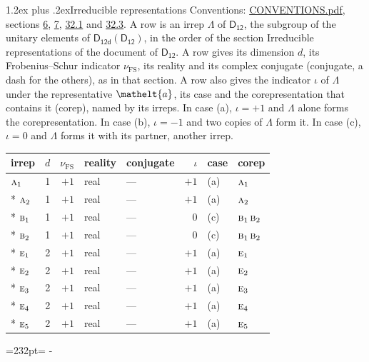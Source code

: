 \documentclass[10pt,a4paper]{article}
\makeatletter
\renewcommand\section{\@startsection{section}{1}{\z@}{-3ex plus -1ex minus -.2ex}%
  {1.2ex plus .2ex}{\normalfont\large\sffamily\bfseries\color{parttitle}}}
\newcommand{\needspace}[1]{\par\penalty-100\begingroup\dimen0=#1\relax\dimen2=\pagegoal
  \advance\dimen2-\pagetotal\ifdim\dimen0>\dimen2\relax\ifdim\dimen2>0pt\vfil\break\fi\fi
  \endgroup}
\numberwithin{equation}{section}
\newcommand{\eltfont}[1]{{\let\sigma\eltsigma\mathelt{#1}}}
\newcommand{\grp}[1]{\mathsf{#1}}
\newcommand{\irr}[1]{\text{\normalfont\scshape #1}}
\newcommand{\elt}[1]{\eltfont{#1}}
\newcommand{\fsind}{\nu_{\mathrm{FS}}}
\makeatother
\begin{document}
\section{Irreducible representations}\label{s:irreps}
Conventions: \href{../../CONVENTIONS.pdf}{CONVENTIONS.pdf}, sections \href{../../../rotation/CONVENTIONS.pdf\#conv.6}{6}, \href{../../../rotation/CONVENTIONS.pdf\#conv.7}{7}, \href{../../CONVENTIONS.pdf\#conv.32.1}{32.1} and \href{../../CONVENTIONS.pdf\#conv.32.3}{32.3}.
\leavevmode\label{n:irrep.Delta}A row is an irrep $\Lambda$ of $\grp{D_{12}}$, the subgroup of the unitary elements of $\grp{D_{12d}}(\grp{D_{12}})$, in the order of the section Irreducible representations of the document of \href{../../../rotation/data/pdf/D12.pdf}{$\grp{D_{12}}$}. \label{n:index.dimension}\label{n:index.frobenius}\label{n:head.irrep}\label{n:head.reality}\label{n:head.conjugate}A row gives its dimension $d$, its Frobenius--Schur indicator $\fsind$, its reality and its complex conjugate (conjugate, a dash for the others), as in that section. \label{n:head.case.corep}\label{n:head.corep}A row also gives the indicator $\iota$ of $\Lambda$ under the representative $\elt{a}$, its case and the corepresentation that contains it (corep), named by its irreps. In case (a), $\iota = +1$ and $\Lambda$ alone forms the corepresentation. In case (b), $\iota = -1$ and two copies of $\Lambda$ form it. In case (c), $\iota = 0$ and $\Lambda$ forms it with its partner, another irrep.
\setlength{\emergencystretch}{2em}\par\setlength{\emergencystretch}{0pt}
{\small\renewcommand{\arraystretch}{1.25}\setlength{\tabcolsep}{4pt}\begin{longtable}{@{}lrrllrll@{}}\toprule
irrep & $d$ & $\fsind$ & reality & conjugate & $\iota$ & case & corep\\\midrule\endhead
\bottomrule\endfoot\endlastfoot
$\irr{a}_{1}$ & 1 & $+1$ & real & --- & $+1$ & (a) & $\irr{a}_{1}$\\*
$\irr{a}_{2}$ & 1 & $+1$ & real & --- & $+1$ & (a) & $\irr{a}_{2}$\\*
$\irr{b}_{1}$ & 1 & $+1$ & real & --- & $0$ & (c) & $\irr{b}_{1}\,\irr{b}_{2}$\\*
$\irr{b}_{2}$ & 1 & $+1$ & real & --- & $0$ & (c) & $\irr{b}_{1}\,\irr{b}_{2}$\\*
$\irr{e}_{1}$ & 2 & $+1$ & real & --- & $+1$ & (a) & $\irr{e}_{1}$\\*
$\irr{e}_{2}$ & 2 & $+1$ & real & --- & $+1$ & (a) & $\irr{e}_{2}$\\*
$\irr{e}_{3}$ & 2 & $+1$ & real & --- & $+1$ & (a) & $\irr{e}_{3}$\\*
$\irr{e}_{4}$ & 2 & $+1$ & real & --- & $+1$ & (a) & $\irr{e}_{4}$\\*
$\irr{e}_{5}$ & 2 & $+1$ & real & --- & $+1$ & (a) & $\irr{e}_{5}$\\
\bottomrule\end{longtable}}
\needspace{232pt}
\end{document}
